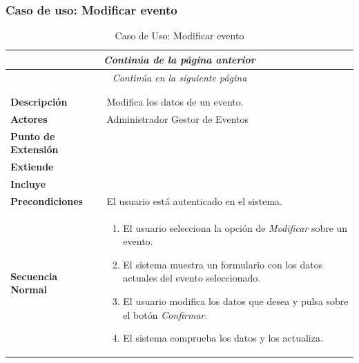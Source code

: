 \subsubsection*{Caso de uso: Modificar evento }
\begin{longtable}{| p{4cm} | p{10cm} |}
\endfirsthead
\multicolumn{2}{c}{\textit{Continúa de la página anterior}}\\[12pt]
\hline
\endhead
\hline
\multicolumn{2}{c}{\textit{Continúa en la siguiente página}} \\
\endfoot
\hline
\caption{Caso de Uso: Modificar evento}\label{fig:1}\\
\endlastfoot


\hline
\multicolumn{2}{|c|}{\textbf{CU$<$40$>$ - Modificar Evento}} \\

\hline
\textbf{Descripción} &
Modifica los datos de un evento.\\

\hline
\textbf{Actores} &
Administrador\newline
Gestor de Eventos\\

\hline
\textbf{Punto de Extensión} &
\\

\hline
\textbf{Extiende} &
\\

\hline
\textbf{Incluye} &
\\

\hline
\textbf{Precondiciones} &
El usuario está autenticado en el sistema.\\

\hline
\textbf{Secuencia Normal} &\mbox{}\par\vspace{-\baselineskip}
\begin{enumerate}[leftmargin=0.7cm, topsep=0.1cm]
\item El usuario selecciona la opción de \textit{Modificar} sobre un evento.
\item El sistema muestra un formulario con los datos actuales del evento seleccionado.
\item El usuario modifica los datos que desea y pulsa sobre el botón \textit{Confirmar}.
\item El sistema comprueba los datos y los actualiza.
\end{enumerate}



\end{longtable}
